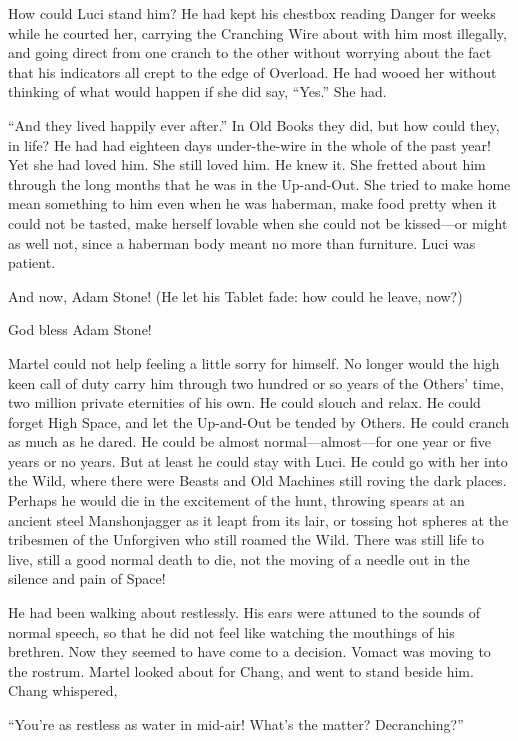 How could Luci stand him? He had kept his chestbox reading Danger for weeks while he courted her, carrying the Cranching Wire about with him most illegally, and going direct from one cranch to the other without worrying about the fact that his indicators all crept to the edge of Overload. He had wooed her without thinking of what would happen if she did say, ``Yes.'' She had.

``And they lived happily ever after.'' In Old Books they did, but how could they, in life? He had had eighteen days under-the-wire in the whole of the past year! Yet she had loved him. She still loved him. He knew it. She fretted about him through the long months that he was in the Up-and-Out. She tried to make home mean something to him even when he was haberman, make food pretty when it could not be tasted, make herself lovable when she could not be kissed---or might as well not, since a haberman body meant no more than furniture. Luci was patient.

And now, Adam Stone! (He let his Tablet fade: how could he leave, now?)

God bless Adam Stone!

Martel could not help feeling a little sorry for himself. No longer would the high keen call of duty carry him through two hundred or so years of the Others' time, two million private eternities of his own. He could slouch and relax. He could forget High Space, and let the Up-and-Out be tended by Others. He could cranch as much as he dared. He could be almost normal---almost---for one year or five years or no years. But at least he could stay with Luci. He could go with her into the Wild, where there were Beasts and Old Machines still roving the dark places. Perhaps he would die in the excitement of the hunt, throwing spears at an ancient steel Manshonjagger as it leapt from its lair, or tossing hot spheres at the tribesmen of the Unforgiven who still roamed the Wild. There was still life to live, still a good normal death to die, not the moving of a needle out in the silence and pain of Space!

He had been walking about restlessly. His ears were attuned to the sounds of normal speech, so that he did not feel like watching the mouthings of his brethren. Now they seemed to have come to a decision. Vomact was moving to the rostrum. Martel looked about for Chang, and went to stand beside him. Chang whispered,

``You're as restless as water in mid-air! What's the matter? Decranching?''

